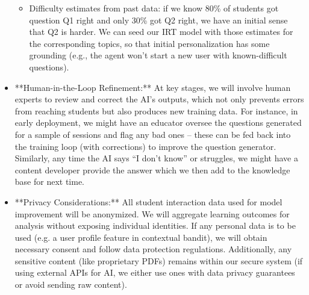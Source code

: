 \documentclass[11pt]{article}
\begin{document}
\begin{itemize}
\begin{itemize}
      \item Difficulty estimates from past data: if we know 80\% of students got question Q1 right and only 30\% got Q2 right, we have an initial sense that Q2 is harder. We can seed our IRT model with those estimates for the corresponding topics, so that initial personalization has some grounding (e.g., the agent won’t start a new user with known-difficult questions).
    \end{itemize}
  \item **Human-in-the-Loop Refinement:** At key stages, we will involve human experts to review and correct the AI’s outputs, which not only prevents errors from reaching students but also produces new training data. For instance, in early deployment, we might have an educator oversee the questions generated for a sample of sessions and flag any bad ones – these can be fed back into the training loop (with corrections) to improve the question generator. Similarly, any time the AI says “I don’t know” or struggles, we might have a content developer provide the answer which we then add to the knowledge base for next time.
  \item **Privacy Considerations:** All student interaction data used for model improvement will be anonymized. We will aggregate learning outcomes for analysis without exposing individual identities. If any personal data is to be used (e.g. a user profile feature in contextual bandit), we will obtain necessary consent and follow data protection regulations. Additionally, any sensitive content (like proprietary PDFs) remains within our secure system (if using external APIs for AI, we either use ones with data privacy guarantees or avoid sending raw content).
\end{itemize}
\end{document}
